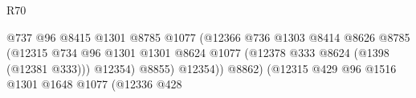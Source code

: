 \begin{lexlean}{R70}
\begin{coremodule}
                                                                  @737
                                                                  @96
                                                                  @8415
                                                                  @1301
                                                                  @8785
                                                                  @1077
                                                                  (@12366
                                                                    @736
                                                                    @1303
                                                                    @8414
                                                                    @8626
                                                                    @8785
                                                                    (@12315
                                                                      @734
                                                                      @96
                                                                      @1301
                                                                      @1301
                                                                      @8624
                                                                      @1077
                                                                      (@12378
                                                                        @333
                                                                        @8624
                                                                        (@1398 (@12381 @333)))
                                                                      @12354)
                                                                    @8855)
                                                                  @12354))
                                                              @8862)
                                                            (@12315
                                                              @429
                                                              @96
                                                              @1516
                                                              @1301
                                                              @1648
                                                              @1077
                                                              (@12336
                                                                @428

\end{coremodule}
\end{lexlean}
